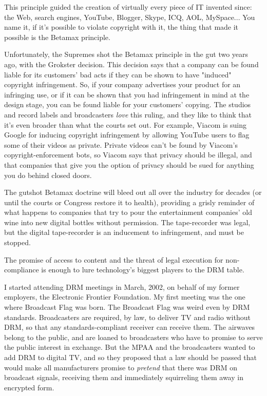 This principle guided the creation of virtually every piece of IT
invented since: the Web, search engines, YouTube, Blogger, Skype,
ICQ, AOL, MySpace... You name it, if it's possible to violate
copyright with it, the thing that made it possible is the Betamax
principle.

Unfortunately, the Supremes shot the Betamax principle in the gut
two years ago, with the Grokster decision. This decision says that
a company can be found liable for its customers' bad acts if they
can be shown to have "induced" copyright infringement. So, if your
company advertises your product for an infringing use, or if it can
be shown that you had infringement in mind at the design stage, you
can be found liable for your customers' copying. The studios and
record labels and broadcasters \emph{love} this ruling, and they
like to think that it's even broader than what the courts set out.
For example, Viacom is suing Google for inducing copyright
infringement by allowing YouTube users to flag some of their videos
as private. Private videos can't be found by Viacom's
copyright-enforcement bots, so Viacom says that privacy should be
illegal, and that companies that give you the option of privacy
should be sued for anything you do behind closed doors.

The gutshot Betamax doctrine will bleed out all over the industry
for decades (or until the courts or Congress restore it to health),
providing a grisly reminder of what happens to companies that try
to pour the entertainment companies' old wine into new digital
bottles without permission. The tape-recorder was legal, but the
digital tape-recorder is an inducement to infringement, and must be
stopped.

The promise of access to content and the threat of legal execution
for non-compliance is enough to lure technology's biggest players
to the DRM table.

I started attending DRM meetings in March, 2002, on behalf of my
former employers, the Electronic Frontier Foundation. My first
meeting was the one where Broadcast Flag was born. The Broadcast
Flag was weird even by DRM standards. Broadcasters are required, by
law, to deliver TV and radio without DRM, so that any
standards-compliant receiver can receive them. The airwaves belong
to the public, and are loaned to broadcasters who have to promise
to serve the public interest in exchange. But the MPAA and the
broadcasters wanted to add DRM to digital TV, and so they proposed
that a law should be passed that would make all manufacturers
promise to \emph{pretend} that there was DRM on broadcast
signals, receiving them and immediately squirreling them away in
encrypted form.

